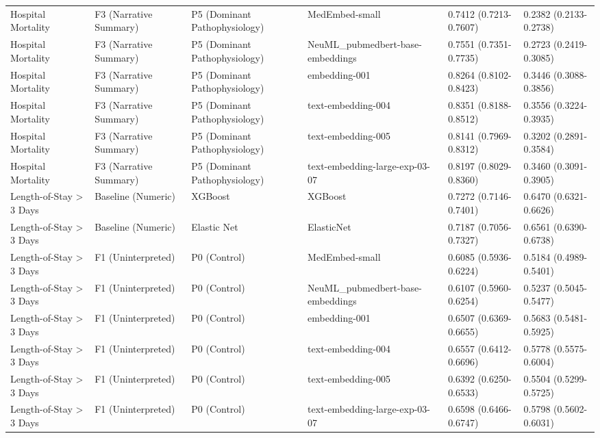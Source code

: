 \documentclass[border=0pt]{standalone}
\begin{document}
\begin{adjustbox}{width=\textwidth}
\begin{tabular}{llllll}
Hospital Mortality & F3 (Narrative Summary) & P5 (Dominant Pathophysiology) & MedEmbed-small & 0.7412 (0.7213-0.7607) & 0.2382 (0.2133-0.2738) \\
Hospital Mortality & F3 (Narrative Summary) & P5 (Dominant Pathophysiology) & NeuML\_pubmedbert-base-embeddings & 0.7551 (0.7351-0.7735) & 0.2723 (0.2419-0.3085) \\
Hospital Mortality & F3 (Narrative Summary) & P5 (Dominant Pathophysiology) & embedding-001 & 0.8264 (0.8102-0.8423) & 0.3446 (0.3088-0.3856) \\
Hospital Mortality & F3 (Narrative Summary) & P5 (Dominant Pathophysiology) & text-embedding-004 & 0.8351 (0.8188-0.8512) & 0.3556 (0.3224-0.3935) \\
Hospital Mortality & F3 (Narrative Summary) & P5 (Dominant Pathophysiology) & text-embedding-005 & 0.8141 (0.7969-0.8312) & 0.3202 (0.2891-0.3584) \\
Hospital Mortality & F3 (Narrative Summary) & P5 (Dominant Pathophysiology) & text-embedding-large-exp-03-07 & 0.8197 (0.8029-0.8360) & 0.3460 (0.3091-0.3905) \\
Length-of-Stay \textgreater{} 3 Days & Baseline (Numeric) & XGBoost & XGBoost & 0.7272 (0.7146-0.7401) & 0.6470 (0.6321-0.6626) \\
Length-of-Stay \textgreater{} 3 Days & Baseline (Numeric) & Elastic Net & ElasticNet & 0.7187 (0.7056-0.7327) & 0.6561 (0.6390-0.6738) \\
Length-of-Stay \textgreater{} 3 Days & F1 (Uninterpreted) & P0 (Control) & MedEmbed-small & 0.6085 (0.5936-0.6224) & 0.5184 (0.4989-0.5401) \\
Length-of-Stay \textgreater{} 3 Days & F1 (Uninterpreted) & P0 (Control) & NeuML\_pubmedbert-base-embeddings & 0.6107 (0.5960-0.6254) & 0.5237 (0.5045-0.5477) \\
Length-of-Stay \textgreater{} 3 Days & F1 (Uninterpreted) & P0 (Control) & embedding-001 & 0.6507 (0.6369-0.6655) & 0.5683 (0.5481-0.5925) \\
Length-of-Stay \textgreater{} 3 Days & F1 (Uninterpreted) & P0 (Control) & text-embedding-004 & 0.6557 (0.6412-0.6696) & 0.5778 (0.5575-0.6004) \\
Length-of-Stay \textgreater{} 3 Days & F1 (Uninterpreted) & P0 (Control) & text-embedding-005 & 0.6392 (0.6250-0.6533) & 0.5504 (0.5299-0.5725) \\
Length-of-Stay \textgreater{} 3 Days & F1 (Uninterpreted) & P0 (Control) & text-embedding-large-exp-03-07 & 0.6598 (0.6466-0.6747) & 0.5798 (0.5602-0.6031) \\

\end{tabular}
\end{adjustbox}
\end{document}
